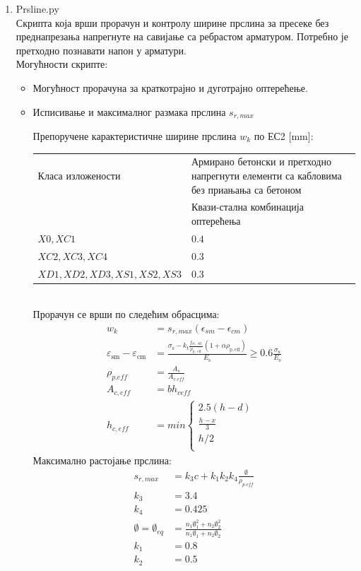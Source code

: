\documentclass[11pt, a4paper]{article}
\begin{document}
\begin{enumerate}
\item {\Large{Prsline.py}}\\	[5mm]

Скрипта која врши прорачун и контролу ширине прслина за пресеке без преднапрезања напрегнуте на савијање са ребрастом арматуром. Потребно је претходно познавати напон у арматури.\\
Могућности скрипте:

\begin{itemize}
	
	\item Могућност прорачуна за краткотрајно и дуготрајно оптерећење.
	
	\item Исписивање и максималног размака прслина  $s_{r,max}$
	
Препоручене карактеристичне ширине прслина $w_k$  по ЕС2 [mm]:\\

\begin{tabular}{|p{6cm}|p{6cm}|}
\hline
 Класа изложености & Армирано бетонски и претходно напрегнути елементи са кабловима без приањања са бетоном\\
& Квази-стална комбинација оптерећења\\
\hline
$X0, XC1$ & $0.4$\\ 
\hline
$XC2, XC3, XC4$ & 0.3\\ 
\hline
$XD1, XD2, XD3, XS1, XS2, XS3$ & 0.3\\
\hline 
\end{tabular}\\[2mm]
Прорачун се врши по следећим обрасцима:
\begin{align*}
	w_k &= s_{r,max}(\epsilon_{sm} - \epsilon_{cm})\\
	\varepsilon_{\mathrm{sm}}-\varepsilon_{\mathrm{cm}}&=\frac{\sigma_{\mathrm{s}}-k_{\mathrm{t}} \frac{f_{\mathrm{ct}, \text { eff }}}{\rho_{\mathrm{p}, \text { eff }}}\left(1+\alpha \rho_{\mathrm{p}, \mathrm{eff}}\right)}{E_{\mathrm{s}}} \geq 0.6 \frac{\sigma_{\mathrm{s}}}{E_{\mathrm{s}}}\\
	\rho_{p.eff} &= \frac{A_{s}}{A_{c.eff}}\\
	A_{c,eff} &= bh_{ceff}\\
	h_{c,eff} &= min \left\{\begin{array}{l}
	2.5(h - d)\\[2mm]
	\frac{h-x}{3}\\[2mm]
	h/2\\
	\end{array}
	\right.	
\end{align*}
Максимално растојање прслина:\\
\begin{align*}
	s_{r,max} &= k_3c + k_1k_2k_4\frac{\emptyset}{\rho_{p.eff}}\\
	k_3 &= 3.4\\
	k_4 &= 0.425\\
	\emptyset = \emptyset_{eq} &= \frac{n_1\emptyset_1^2+n_2\emptyset_2^2}{n_1\emptyset_1 + n_2\emptyset_2}\\
	k_1 &= 0.8\\
	k_2 &= 0.5
\end{align*}
\end{itemize}


\end{enumerate}
\end{document}
